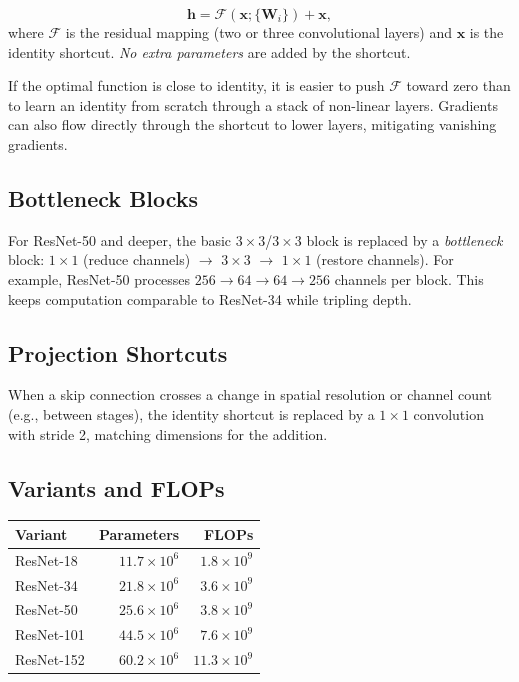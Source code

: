 \documentclass[11pt, oneside]{book}
\newcommand{\xvec}{\mathbf{x}}
\newcommand{\hvec}{\mathbf{h}}
\begin{document}
\begin{defbox}[title={Residual Block}]
\[
  \hvec = \mathcal{F}(\xvec;\{\mathbf{W}_i\}) + \xvec,
\]
where $\mathcal{F}$ is the residual mapping (two or three convolutional layers)
and $\xvec$ is the identity shortcut.
\emph{No extra parameters} are added by the shortcut.
\end{defbox}

\begin{intbox}
If the optimal function is close to identity, it is easier to push $\mathcal{F}$ toward
zero than to learn an identity from scratch through a stack of non-linear layers.
Gradients can also flow directly through the shortcut to lower layers,
mitigating vanishing gradients.
\end{intbox}

\subsection{Bottleneck Blocks}

For ResNet-50 and deeper, the basic $3\times3$/$3\times3$ block is replaced by
a \emph{bottleneck} block: $1\times1$ (reduce channels) $\to$ $3\times3$ $\to$
$1\times1$ (restore channels).
For example, ResNet-50 processes $256 \to 64 \to 64 \to 256$ channels per block.
This keeps computation comparable to ResNet-34 while tripling depth.

\subsection{Projection Shortcuts}

When a skip connection crosses a change in spatial resolution or channel count
(e.g., between stages), the identity shortcut is replaced by a $1\times1$
convolution with stride 2, matching dimensions for the addition.

\subsection{Variants and FLOPs}

\begin{center}
\small
\begin{tabular}{lrr}
\toprule
\textbf{Variant} & \textbf{Parameters} & \textbf{FLOPs} \\
\midrule
ResNet-18  & $11.7 \times 10^6$ & $1.8 \times 10^9$ \\
ResNet-34  & $21.8 \times 10^6$ & $3.6 \times 10^9$ \\
ResNet-50  & $25.6 \times 10^6$ & $3.8 \times 10^9$ \\
ResNet-101 & $44.5 \times 10^6$ & $7.6 \times 10^9$ \\
ResNet-152 & $60.2 \times 10^6$ & $11.3 \times 10^9$ \\
\bottomrule
\end{tabular}
\end{center}
\end{document}

